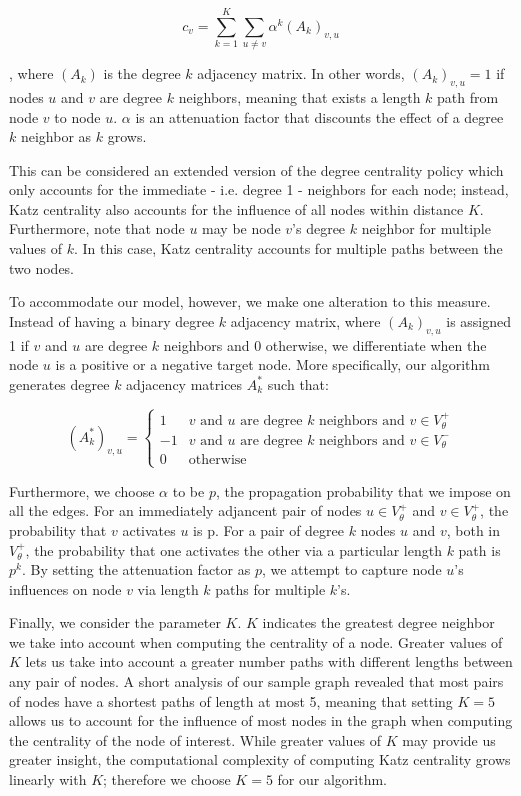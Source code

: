 \begin{equation}
c_v = \sum_{k=1}^{K} \sum_{u \neq v} {\alpha}^k (A_k)_{v, u}
\end{equation}

, where $(A_k)$ is the degree $k$ adjacency matrix. In other words,  $(A_k)_{v, u} = 1$ if nodes $u$ and $v$ are degree $k$ neighbors, meaning that exists a length $k$ path from node $v$ to node $u$. ${\alpha}$ is an attenuation factor that discounts the effect of a degree $k$ neighbor as $k$ grows. 

This can be considered an extended version of the degree centrality policy which only accounts for the immediate - i.e. degree 1 - neighbors for each node; instead, Katz centrality also accounts for the influence of all nodes within distance $K$. Furthermore, note that node $u$ may be node $v$'s degree $k$ neighbor for multiple values of $k$. In this case, Katz centrality accounts for multiple paths between the two nodes.

To accommodate our model, however, we make one alteration to this measure. Instead of having a binary degree $k$ adjacency matrix, where $(A_k)_{v, u}$ is assigned 1 if $v$ and $u$ are degree $k$ neighbors and $0$ otherwise, we differentiate when the node $u$ is a positive or a negative target node. More specifically, our algorithm generates degree $k$ adjacency matrices $A^*_k$ such that:

\begin{equation*}
(A^*_k)_{v, u} = \begin{cases}
1 &\text{$v$ and $u$ are degree $k$ neighbors and $v \in V_\theta^+$}\\
-1 &\text{$v$ and $u$ are degree $k$ neighbors and $v \in V_\theta^-$}\\
0 &\text{otherwise}
\end{cases}
\end{equation*}

Furthermore, we choose $\alpha$ to be $p$, the propagation probability that we impose on all the edges. For an immediately adjancent pair of nodes $u \in V_\theta^+$ and $v \in V_\theta^+$, the probability that $v$ activates $u$ is p. For a pair of degree $k$ nodes $u$ and $v$, both in $V_\theta^+$, the probability that one activates the other via a particular length $k$ path is $p^k$. By setting the attenuation factor as $p$, we attempt to capture node $u$'s influences on node $v$ via length $k$ paths for multiple $k$'s.

Finally, we consider the parameter $K$. $K$ indicates the greatest degree neighbor we take into account when computing the centrality of a node. Greater values of $K$ lets us take into account a greater number paths with different lengths between any pair of nodes. A short analysis of our sample graph revealed that most pairs of nodes have a shortest paths of length at most 5, meaning that setting $K=5$ allows us to account for the influence of most nodes in the graph when computing the centrality of the node of interest. While greater values of $K$ may provide us greater insight, the computational complexity of computing Katz centrality grows linearly with $K$; therefore we choose $K=5$ for our algorithm.

